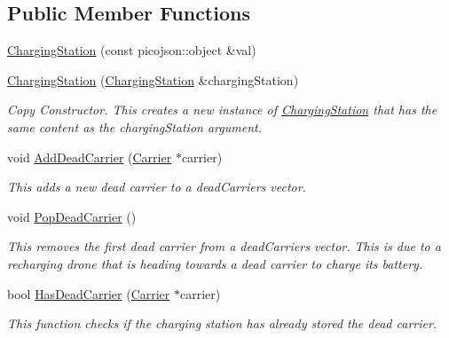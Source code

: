 \subsection*{Public Member Functions}
\begin{DoxyCompactItemize}
\item 
\hyperlink{classcsci3081_1_1ChargingStation_a97fba4a68715e6b8305557c9b76571dd}{Charging\+Station} (const picojson\+::object \&val)
\item 
\hyperlink{classcsci3081_1_1ChargingStation_a3e5d04367a8cb19604714f6544e104b0}{Charging\+Station} (\hyperlink{classcsci3081_1_1ChargingStation}{Charging\+Station} \&charging\+Station)
\begin{DoxyCompactList}\small\item\em Copy Constructor. This creates a new instance of \hyperlink{classcsci3081_1_1ChargingStation}{Charging\+Station} that has the same content as the charging\+Station argument. \end{DoxyCompactList}\item 
void \hyperlink{classcsci3081_1_1ChargingStation_a903c7a2bf4e869ddae25409a567a16f2}{Add\+Dead\+Carrier} (\hyperlink{classcsci3081_1_1Carrier}{Carrier} $\ast$carrier)
\begin{DoxyCompactList}\small\item\em This adds a new dead carrier to a dead\+Carriers vector. \end{DoxyCompactList}\item 
\mbox{\label{classcsci3081_1_1ChargingStation_a3c80d7f7982b2f14aff813fc0fa4772b}} 
void \hyperlink{classcsci3081_1_1ChargingStation_a3c80d7f7982b2f14aff813fc0fa4772b}{Pop\+Dead\+Carrier} ()
\begin{DoxyCompactList}\small\item\em This removes the first dead carrier from a dead\+Carriers vector. This is due to a recharging drone that is heading towards a dead carrier to charge its battery. \end{DoxyCompactList}\item 
bool \hyperlink{classcsci3081_1_1ChargingStation_adb8fc616c40a8b8fd2b8e1259453ca9e}{Has\+Dead\+Carrier} (\hyperlink{classcsci3081_1_1Carrier}{Carrier} $\ast$carrier)
\begin{DoxyCompactList}\small\item\em This function checks if the charging station has already stored the dead carrier. \end{DoxyCompactList}\item 

\end{DoxyCompactItemize}
